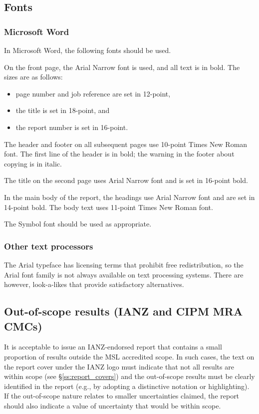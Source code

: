 \subsection{Fonts}
\subsubsection{Microsoft Word}
In Microsoft Word, the following fonts should be used.

On the front page, the Arial Narrow font is used, and all text is in bold. The sizes are as follows:
\begin{itemize}
\item	page number and job reference are set in 12-point, 
\item	the title is set in 18-point, and 
\item	the report number is set in 16-point.
\end{itemize}
The header and footer on all subsequent pages use 10-point Times New Roman font. The first line of the header is in bold; the warning in the footer about copying is in italic. 

The title on the second page uses Arial Narrow font and is set in 16-point bold.

In the main body of the report, the headings use Arial Narrow font and are set in 14-point bold. The body text uses 11-point Times New Roman font.
 
The Symbol font should be used as appropriate.

\subsubsection{Other text processors}
The Arial typeface has licensing terms that prohibit free redistribution, so the Arial font family is not always available on text processing systems. There are however, look-a-likes that provide satisfactory alternatives.

\subsection{Out-of-scope results (IANZ and CIPM MRA CMCs)}
It is acceptable to issue an IANZ-endorsed report that contains a small proportion of results outside the MSL accredited scope. In such cases, the text on the report cover under the IANZ logo must indicate that not all results are within scope (see \S\ref{ss:report_covers}) and the out-of-scope results must be clearly identified in the report (e.g., by adopting a distinctive notation or highlighting). If the out-of-scope nature relates to smaller uncertainties claimed, the report should also indicate a value of uncertainty that would be within scope.

